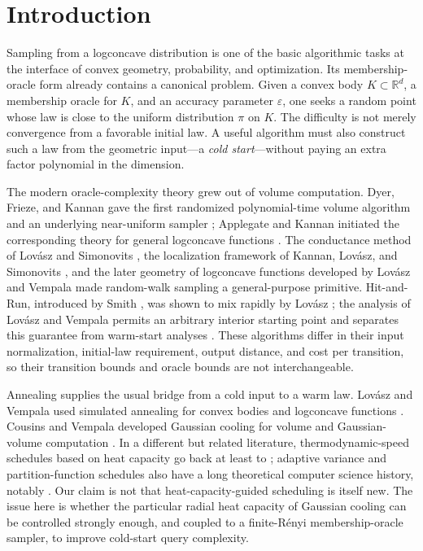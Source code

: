 \documentclass[11pt]{article}
\theoremstyle{remark}
\newcommand{\R}{\mathbb R}
\newcommand{\1}{\bm 1}
\newcommand{\eps}{\varepsilon}
\begin{document}
\section{Introduction}

Sampling from a logconcave distribution is one of the basic algorithmic
tasks at the interface of convex geometry, probability, and
optimization.  Its membership-oracle form already contains a canonical
problem.  Given a convex body $K\subset\R^d$, a membership oracle for
$K$, and an accuracy parameter $\eps$, one seeks a random point whose
law is close to the uniform distribution $\pi$ on $K$.  The difficulty
is not merely convergence from a favorable initial law.  A useful
algorithm must also construct such a law from the geometric input---a
\emph{cold start}---without paying an extra factor polynomial in the
dimension.

The modern oracle-complexity theory grew out of volume computation.
Dyer, Frieze, and Kannan gave the first randomized polynomial-time
volume algorithm and an underlying near-uniform sampler
\citep{DFK91random}; Applegate and Kannan initiated the corresponding
theory for general logconcave functions \citep{AK91sampling}.  The
conductance method of Lov\'asz and Simonovits
\citep{LS90mixing,LS93random}, the localization framework of Kannan,
Lov\'asz, and Simonovits \citep{KLS95isop,KLS97random}, and the later
geometry of logconcave functions developed by Lov\'asz and Vempala
\citep{LV07geometry} made random-walk sampling a general-purpose
primitive.  Hit-and-Run, introduced by Smith \citep{Smith84HAR}, was
shown to mix rapidly by Lov\'asz \citep{Lovasz99hit}; the analysis of
Lov\'asz and Vempala permits an arbitrary interior starting point and
separates this guarantee from warm-start analyses
\citep{LV06hit}.  These algorithms differ in their input normalization,
initial-law requirement, output distance, and cost per transition, so
their transition bounds and oracle bounds are not interchangeable.

Annealing supplies the usual bridge from a cold input to a warm law.
Lov\'asz and Vempala used simulated annealing for convex bodies and
logconcave functions \citep{LV06simulated,LV06fast}.  Cousins and
Vempala developed Gaussian cooling for volume and Gaussian-volume
  computation \citep{CV15bypass,CV18Gaussian}.  In a different but related
  literature, thermodynamic-speed schedules based on heat capacity go
  back at least to \citet{SalamonEtAl1988}; adaptive variance and
  partition-function schedules also have a long theoretical computer
  science history, notably \citet{SVV09}.  Our claim is not that
  heat-capacity-guided scheduling is itself new.  The issue
here is whether the particular radial heat capacity of Gaussian cooling
can be controlled strongly enough, and coupled to a finite-R\'enyi
membership-oracle sampler, to improve cold-start query complexity.
\end{document}
